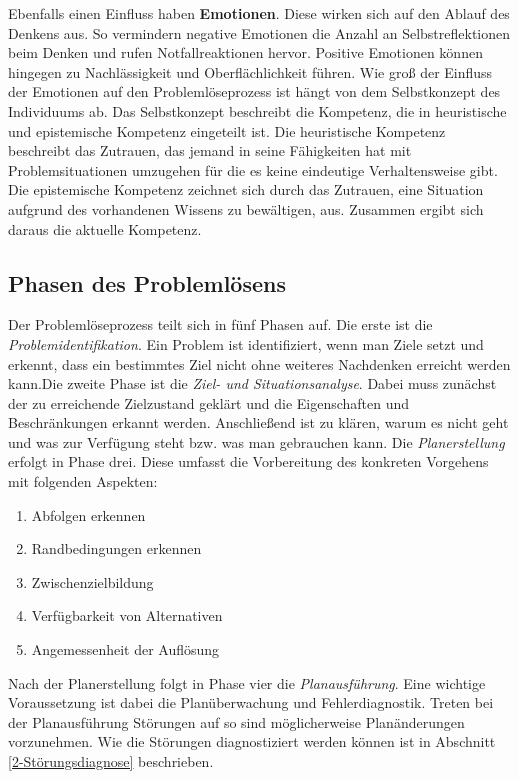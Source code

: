 Ebenfalls einen Einfluss haben \textbf{Emotionen}.
Diese wirken sich auf den Ablauf des Denkens aus. So vermindern negative Emotionen die Anzahl an Selbstreflektionen beim Denken und rufen Notfallreaktionen hervor. Positive Emotionen können hingegen zu Nachlässigkeit und Oberflächlichkeit führen. Wie groß der Einfluss der Emotionen auf den Problemlöseprozess ist hängt von dem Selbstkonzept des Individuums ab. Das Selbstkonzept beschreibt die Kompetenz, die in heuristische und epistemische Kompetenz eingeteilt ist. Die heuristische Kompetenz beschreibt das Zutrauen, das jemand in seine Fähigkeiten hat mit Problemsituationen umzugehen für die es keine eindeutige Verhaltensweise gibt. Die epistemische Kompetenz zeichnet sich durch das Zutrauen, eine Situation aufgrund des vorhandenen Wissens zu bewältigen, aus. Zusammen ergibt sich daraus die aktuelle Kompetenz. \cite{Dorner1984}

\subsection{Phasen des Problemlösens}
Der Problemlöseprozess teilt sich in fünf Phasen auf. Die erste ist die \textit{Problemidentifikation}. \glqq Ein Problem ist identifiziert, wenn man Ziele setzt und erkennt, dass ein bestimmtes Ziel nicht ohne weiteres Nachdenken erreicht werden kann.\grqq Die zweite Phase ist die \textit{Ziel- und Situationsanalyse}. Dabei muss zunächst der zu erreichende Zielzustand geklärt und die Eigenschaften und Beschränkungen erkannt werden. Anschließend ist zu klären, warum es nicht geht und was zur Verfügung steht bzw. was man gebrauchen kann. Die \textit{Planerstellung} erfolgt in Phase drei. Diese umfasst die Vorbereitung des konkreten Vorgehens mit folgenden Aspekten:
\begin{enumerate}
\item Abfolgen erkennen
\item Randbedingungen erkennen
\item Zwischenzielbildung
\item Verfügbarkeit von Alternativen
\item Angemessenheit der Auflösung
\end{enumerate}
Nach der Planerstellung folgt in Phase vier die \textit{Planausführung}. Eine wichtige Voraussetzung ist dabei die Planüberwachung und Fehlerdiagnostik. Treten bei der Planausführung Störungen auf so sind möglicherweise Planänderungen vorzunehmen. Wie die Störungen diagnostiziert werden können ist in Abschnitt \ref{2-Störungsdiagnose} beschrieben.

